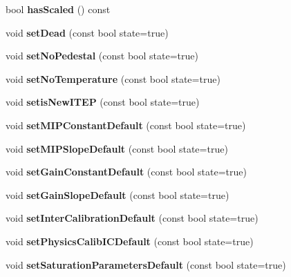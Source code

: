 \begin{DoxyCompactItemize}
\item 
bool {\bfseries hasScaled} () const \label{classCALICE_1_1Ahc2CalibrationStatusBits_a7722b3dc5a233bcb4390f62f809dd56c}

\item 
void {\bfseries setDead} (const bool state=true)\label{classCALICE_1_1Ahc2CalibrationStatusBits_a7086d3e5eb96292e47cd896457986780}

\item 
void {\bfseries setNoPedestal} (const bool state=true)\label{classCALICE_1_1Ahc2CalibrationStatusBits_a759b14ec17dfa8266058ee01400fec4e}

\item 
void {\bfseries setNoTemperature} (const bool state=true)\label{classCALICE_1_1Ahc2CalibrationStatusBits_aa3c37fe71a8a3727699dda63f145d08e}

\item 
void {\bfseries setisNewITEP} (const bool state=true)\label{classCALICE_1_1Ahc2CalibrationStatusBits_a618d44185909927e61bf308b71ab3f02}

\item 
void {\bfseries setMIPConstantDefault} (const bool state=true)\label{classCALICE_1_1Ahc2CalibrationStatusBits_a563abd517939b634e2d4a032476c5f50}

\item 
void {\bfseries setMIPSlopeDefault} (const bool state=true)\label{classCALICE_1_1Ahc2CalibrationStatusBits_a93d2fb3dbcae45735a46faaea352c39b}

\item 
void {\bfseries setGainConstantDefault} (const bool state=true)\label{classCALICE_1_1Ahc2CalibrationStatusBits_ab4b50418d9b99b263842832f41cf6d8f}

\item 
void {\bfseries setGainSlopeDefault} (const bool state=true)\label{classCALICE_1_1Ahc2CalibrationStatusBits_a8a9da4c25b8317896497ec216f831fc6}

\item 
void {\bfseries setInterCalibrationDefault} (const bool state=true)\label{classCALICE_1_1Ahc2CalibrationStatusBits_adb01ce4e46929b52e7fb89dcc8e0d89b}

\item 
void {\bfseries setPhysicsCalibICDefault} (const bool state=true)\label{classCALICE_1_1Ahc2CalibrationStatusBits_a7b51b16ade7fdf0803b968e41e94303e}

\item 
void {\bfseries setSaturationParametersDefault} (const bool state=true)\label{classCALICE_1_1Ahc2CalibrationStatusBits_a215a322f8475633417f9727e1f073908}


\end{DoxyCompactItemize}

